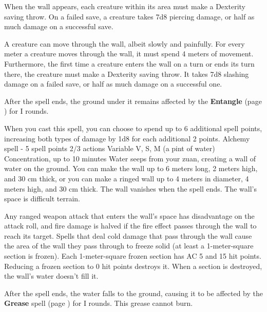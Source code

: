         When the wall appears, each creature within its area must make a Dexterity saving throw.
        On a failed save, a creature takes 7d8 piercing damage, or half as much damage on a successful save.

        A creature can move through the wall, albeit slowly and painfully.
        For every meter a creature moves through the wall, it must spend 4 meters of movement.
        Furthermore, the first time a creature enters the wall on a turn or ends its turn there, the creature must make a Dexterity saving throw.
        It takes 7d8 slashing damage on a failed save, or half as much damage on a successful one.

        After the spell ends, the ground under it remains affected by the \textbf{Entangle} (page \pageref{spell::entangle}) for I rounds.

        When you cast this spell, you can choose to spend up to 6 additional spell points, increasing both types of damage by 1d8 for each additional 2 points.
        {Alchemy spell - 5 spell points}
        {2/3 actions}
        {Variable}
        {V, S, M (a pint of water)}
        {Concentration, up to 10 minutes}
        Water seeps from your zuan, creating a wall of water on the ground.
        You can make the wall up to 6 meters long, 2 meters high, and 30 cm thick, or you can make a ringed wall up to 4 meters in diameter, 4 meters high, and 30 cm thick.
        The wall vanishes when the spell ends.
        The wall's space is difficult terrain.

        Any ranged weapon attack that enters the wall's space has disadvantage on the attack roll, and fire damage is halved if the fire effect passes through the wall to reach its target.
        Spells that deal cold damage that pass through the wall cause the area of the wall they pass through to freeze solid (at least a 1-meter-square section is frozen).
        Each 1-meter-square frozen section has AC 5 and 15 hit points.
        Reducing a frozen section to 0 hit points destroys it.
        When a section is destroyed, the wall's water doesn't fill it.

        After the spell ends, the water falls to the ground, causing it to be affected by the \textbf{Grease} spell (page \pageref{spell::grease}) for I rounds.
        This grease cannot burn.


